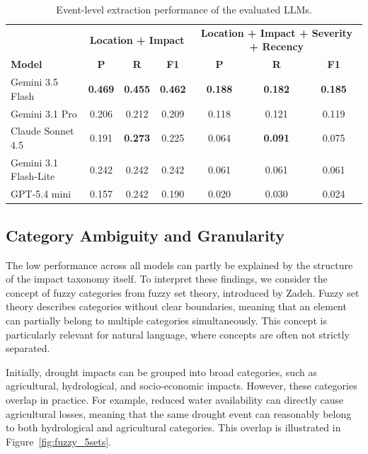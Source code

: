 \begin{table}[h!]
\centering
\caption{Event-level extraction performance of the evaluated LLMs.}
\label{tab:model_performance}
\small
\begin{tabular}{lccc|ccc}
\hline
& \multicolumn{3}{c|}{\textbf{Location + Impact}} & \multicolumn{3}{c}{\textbf{Location + Impact + Severity + Recency}} \\
\textbf{Model} & \textbf{P} & \textbf{R} & \textbf{F1} & \textbf{P} & \textbf{R} & \textbf{F1} \\
\hline
Gemini 3.5 Flash      & \textbf{0.469} & \textbf{0.455} & \textbf{0.462} & \textbf{0.188} & \textbf{0.182} & \textbf{0.185} \\
Gemini 3.1 Pro        & 0.206 & 0.212 & 0.209 & 0.118 & 0.121 & 0.119 \\
Claude Sonnet 4.5     & 0.191 & \textbf{0.273} & 0.225 & 0.064 & \textbf{0.091} & 0.075 \\
Gemini 3.1 Flash-Lite & 0.242 & 0.242 & 0.242 & 0.061 & 0.061 & 0.061 \\
GPT-5.4 mini          & 0.157 & 0.242 & 0.190 & 0.020 & 0.030 & 0.024 \\
\hline
\end{tabular}
\end{table}





\label{sec:variable_performance}



\subsection{Category Ambiguity and Granularity}

The low performance across all models can partly be explained by the structure of the impact taxonomy itself. To interpret these findings, we consider the concept of fuzzy categories from fuzzy set theory, introduced by Zadeh. Fuzzy set theory describes categories without clear boundaries, meaning that an element can partially belong to multiple categories simultaneously. This concept is particularly relevant for natural language, where concepts are often not strictly separated.

Initially, drought impacts can be grouped into broad categories, such as agricultural, hydrological, and socio-economic impacts. However, these categories overlap in practice. For example, reduced water availability can directly cause agricultural losses, meaning that the same drought event can reasonably belong to both hydrological and agricultural categories. This overlap is illustrated in Figure~\ref{fig:fuzzy_5sets}.

